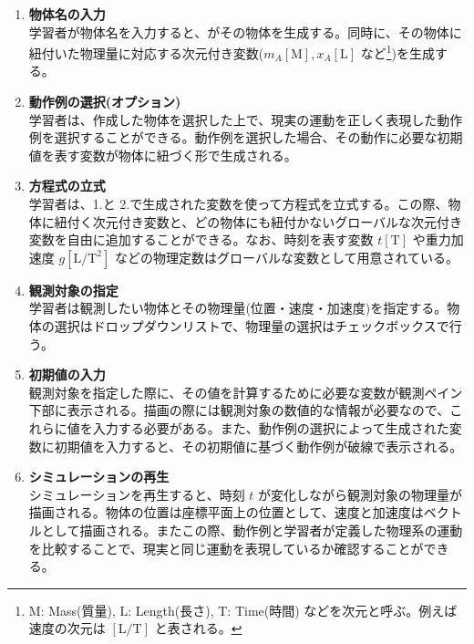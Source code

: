 \begin{enumerate}
\item \textbf{物体名の入力}\\
学習者が物体名を入力すると、\simname がその物体を生成する。同時に、その物体に紐付いた物理量に対応する次元付き変数($m_A\mathrm{[M]}, x_A\mathrm{[L]}$ など\footnote{$\mathrm{M}$: Mass(質量), $\mathrm{L}$: Length(長さ), $\mathrm{T}$: Time(時間) などを次元と呼ぶ。例えば速度の次元は $\mathrm{[L/T]}$ と表される。})を生成する。
\item \textbf{動作例の選択(オプション)}\\
学習者は、作成した物体を選択した上で、現実の運動を正しく表現した動作例を選択することができる。動作例を選択した場合、その動作に必要な初期値を表す変数が物体に紐づく形で生成される。
\item \textbf{方程式の立式}\\
学習者は、1.と 2.で生成された変数を使って方程式を立式する。この際、物体に紐付く次元付き変数と、どの物体にも紐付かないグローバルな次元付き変数を自由に追加することができる。なお、時刻を表す変数 $t\mathrm{[T]}$ や重力加速度 $g\mathrm{[L/T^2]}$ などの物理定数はグローバルな変数として用意されている。
\item \textbf{観測対象の指定}\\
学習者は観測したい物体とその物理量(位置・速度・加速度)を指定する。物体の選択はドロップダウンリストで、物理量の選択はチェックボックスで行う。
\item \textbf{初期値の入力}\\
観測対象を指定した際に、その値を計算するために必要な変数が観測ペイン下部に表示される。描画の際には観測対象の数値的な情報が必要なので、これらに値を入力する必要がある。また、動作例の選択によって生成された変数に初期値を入力すると、その初期値に基づく動作例が破線で表示される。
\item \textbf{シミュレーションの再生}\\
シミュレーションを再生すると、時刻 $t$ が変化しながら観測対象の物理量が描画される。物体の位置は座標平面上の位置として、速度と加速度はベクトルとして描画される。またこの際、動作例と学習者が定義した物理系の運動を比較することで、現実と同じ運動を表現しているか確認することができる。
\end{enumerate}

